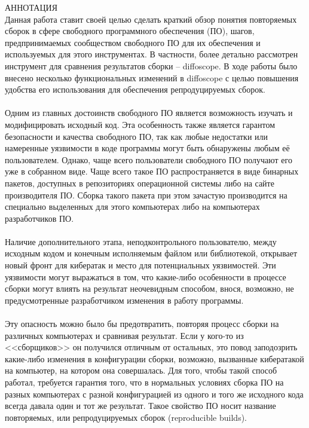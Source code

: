{\centering
%
\SuperFont\MakeTextUppercase{Аннотация}\\
}
Данная работа ставит своей целью сделать краткий обзор понятия повторяемых сборок в сфере свободного программного обеспечения (ПО), шагов, предпринимаемых сообществом свободного ПО для их обеспечения и используемых для этого инструментах. В частности, более детально рассмотрен инструмент для сравнения результатов сборки -- diffoscope. В ходе работы было внесено несколько функциональных изменений в diffoscope с целью повышения удобства его использования для обеспечения репродуцируемых сборок.\\\\
Одним из главных достоинств свободного ПО является возможность изучать и модифицировать исходный код. Эта особенность также является гарантом безопасности и качества свободного ПО, так как любые недостатки или намеренные уязвимости в коде программы могут быть обнаружены любым её пользователем. Однако, чаще всего пользователи свободного ПО получают его уже в собранном виде. Чаще всего такое ПО распространяется в виде бинарных пакетов, доступных в репозиториях операционной системы либо на сайте производителя ПО. Сборка такого пакета при этом зачастую производится на специально выделенных для этого компьютерах либо на компьютерах разработчиков ПО.\\\\
Наличие дополнительного этапа, неподконтрольного пользователю, между исходным кодом и конечным исполняемым файлом или библиотекой, открывает новый фронт для кибератак и место для потенциальных уязвимостей. Эти уязвимости могут выражаться в том, что какие-либо особенности в процессе сборки могут влиять на результат неочевидным способом, внося, возможно, не предусмотренные разработчиком изменения в работу программы.\\\\
Эту опасность можно было бы предотвратить, повторяя процесс сборки на различных компьютерах и сравнивая результат. Если у кого-то из <<сборщиков>> он получился отличным от остальных, это повод заподозрить какие-либо изменения в конфигурации сборки, возможно, вызванные кибератакой на компьютер, на котором она совершалась. Для того, чтобы такой способ работал, требуется гарантия того, что в нормальных условиях сборка ПО на разных компьютерах с разной конфигурацией из одного и того же исходного кода всегда давала один и тот же результат. Такое свойство ПО носит название повторяемых, или репродуцируемых сборок (reproducible builds).\\\\
